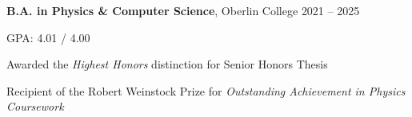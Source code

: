 \begin{entry}
	{{\bf B.A. in Physics \& Computer Science}, Oberlin College}
	{2021 -- 2025}

	GPA: 4.01 / 4.00

	Awarded the {\em Highest Honors} distinction for Senior Honors Thesis

	Recipient of the Robert Weinstock Prize for {\em Outstanding Achievement in Physics Coursework}
\end{entry}
